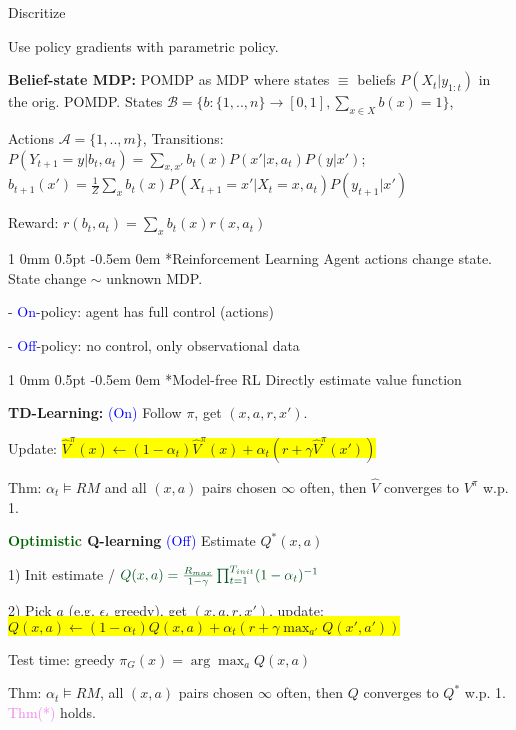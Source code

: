 \documentclass[11pt,landscape,a4paper,fleqn]{article}
\makeatletter
\newcommand*{\rsection}{%
	\@startsection{section}%
	{1}%
	{0mm}%
	{0.5pt}%
	{-0.5em \@plus 0em}
	{\color{myorange}\sffamily\small\bfseries}}
\newcommand{\mhl}[1]{\setlength{\fboxsep}{0pt}\colorbox{yellow}{#1}}
\makeatother
\begin{document}
\begin{multicols*}{4}
Discritize

Use policy gradients with parametric policy.

\textbf{Belief-state MDP:} POMDP as MDP where states $\equiv$ beliefs $P(X_t | y_{1:t})$ in the orig. POMDP. States $\mathcal{B} = \{b : \{1,..,n\} \rightarrow [0,1], \sum_{x \in X} b(x) = 1\}$,

{\fontsize{9.5}{6}\selectfont Actions $\mathcal{A} = \{1,..,m\}$}, Transitions: $P(Y_{t+1} = y | b_t, a_t) = \sum_{x,x'} b_t(x) P(x' | x, a_t) P(y | x')$;
$b_{t+1}(x') = \frac{1}{Z} \sum_x b_t(x) P(X_{t+1} = x' | X_t = x, a_t) P(y_{t+1} | x')$

Reward: $r(b_t, a_t) = \sum_x b_t(x) r(x, a_t)$

\fi

\vspace*{1mm}
\rsection*{Reinforcement Learning} Agent actions change state. State change $\sim$ unknown MDP.

- \textcolor{blue}{On}-policy: agent has full control (actions)

- \textcolor{blue}{Off}-policy: no control, only observational data 


\vspace*{1mm}
\rsection*{Model-free RL} {\fontsize{9.5}{6}\selectfont Directly estimate value function}

\textbf{TD-Learning:} {\fontsize{9}{6}\selectfont \textcolor{blue}{(On)}} Follow $\pi$, get $(x,a,r,x')$. 

Update: \mhl{$\hat{V}^\pi(x) \leftarrow (1 - \alpha_t) \hat{V}^\pi(x) + \alpha_t (r + \gamma \hat{V}^\pi(x'))$}

Thm: $\alpha_t \vDash RM$ and all $(x,a)$ pairs chosen $\infty$ often, then $\hat{V}$ converges to $V^\pi$ w.p. 1.


\textbf{\textcolor{darkgreen}{Optimistic} Q-learning} {\fontsize{9}{6}\selectfont \textcolor{blue}{(Off)}} Estimate $Q^*(x,a)$

1) Init estimate / $\textcolor{darkgreen}{Q(x,a) = \frac{R_{max}}{1 - \gamma} \prod_{t=1}^{T_{init}} (1 - \alpha_t)^{-1}}$

2) Pick $a$ (e.g. $\epsilon_t$ greedy), get $(x,a,r,x')$, update: \mhl{$Q(x,a) \leftarrow (1 - \alpha_t) Q(x,a) + \alpha_t (r + \gamma \max_{a'} Q(x', a'))$}

Test time: greedy $\pi_G(x) = \arg\max_a Q(x,a)$

Thm: $\alpha_t \vDash RM$, all $(x,a)$ pairs chosen $\infty$ often, then $Q$ converges to $Q^*$ w.p. 1. \textcolor{violet}{Thm(*)} holds.


\end{multicols*}
\end{document}

